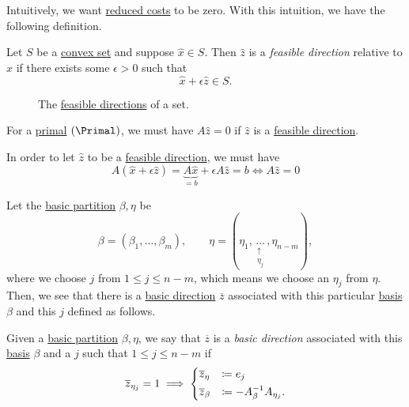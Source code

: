 Intuitively, we want \hyperref[def:reduced-cost]{reduced costs} to be zero. With this intuition, we have the following definition.

\begin{definition}\label{def:feasible-direction}
	Let \(S\) be a \hyperref[def:convex-set]{convex set} and suppose \(\hat{x}\in S\). Then \(\hat{z}\) is a \emph{feasible direction} relative to \(\hat{x}\) if there exists some \(\epsilon>0\) such that
	\[
		\hat{x}+\epsilon \hat{z} \in S.
	\]
\end{definition}

\begin{figure}[H]
	\centering
	\caption{The \hyperref[def:feasible-direction]{feasible directions} of a set.}
	\label{fig:feasible-direction}
\end{figure}

\begin{remark}
	For a \hyperref[def:primal]{primal} \((\Primal)\), we must have \(A \hat{z} = 0\) if \(\hat{z}\) is a \hyperref[def:feasible-direction]{feasible direction}.
\end{remark}
\begin{explanation}
	In order to let \(\hat{z}\) to be a \hyperref[def:feasible-direction]{feasible direction}, we must have
	\[
		A(\hat{x} + \epsilon \hat{z}) = \underbrace{A \hat{x}}_{=b} + \epsilon A \hat{z} = b \iff A \hat{z} = 0
	\]
\end{explanation}

Let the \hyperref[def:basic-partition]{basic partition} \(\beta, \eta\) be
\[
	\beta = (\beta_1, \dots , \beta_m), \qquad \eta = (\eta_1, \underset{\substack{\uparrow \\ \eta_j}}{\dots} , \eta_{n-m}),
\]
where we choose \(j\) from \(1\leq j \leq n-m\), which means we choose an \(\eta_j\) from \(\eta\). Then, we see that there is a \hyperref[def:basic-direction]{basic direction} \(\overline{z}\) associated with this particular \hyperref[def:basis]{basis} \(\beta \) and this \(j\) defined as follows.

\begin{definition}\label{def:basic-direction}
	Given a \hyperref[def:basic-partition]{basic partition} \(\beta, \eta\), we say that \(\overline{z}\) is a \emph{basic direction} associated with this \hyperref[def:basis]{basis} \(\beta\)
	and a \(j\) such that \(1 \leq j \leq n-m\) if
	\[
		\overline{z}_{\eta_j} = 1 \implies \begin{dcases}
			\overline{z}_{\eta}  & \coloneqq e_j                        \\
			\overline{z}_{\beta} & \coloneqq -A^{-1}_{\beta}A_{\eta_j}.
		\end{dcases}
	\]
\end{definition}

